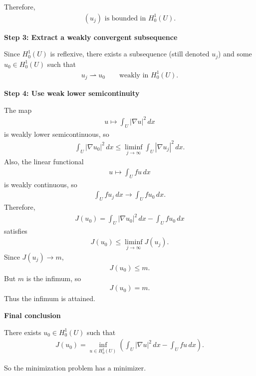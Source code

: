 \documentclass[12pt,a4paper]{report}
\begin{document}
\begin{description}
\begin{description}
Therefore,
\begin{align*}
(u_j)\text{ is bounded in }H_0^1(U).
\end{align*}

\item \textbf{Step 3: Extract a weakly convergent subsequence}

Since $H_0^1(U)$ is reflexive, there exists a subsequence (still denoted $u_j$) and some $u_0\in H_0^1(U)$ such that
\begin{align*}
u_j\rightharpoonup u_0 \qquad\text{weakly in }H_0^1(U).
\end{align*}

\item \textbf{Step 4: Use weak lower semicontinuity}

The map
\begin{align*}
u\mapsto \int_U |\nabla u|^2\,dx
\end{align*}
is weakly lower semicontinuous, so
\begin{align*}
\int_U |\nabla u_0|^2\,dx \le \liminf_{j\to\infty} \int_U |\nabla u_j|^2\,dx.
\end{align*}
Also, the linear functional
\begin{align*}
u\mapsto \int_U fu\,dx
\end{align*}
is weakly continuous, so
\begin{align*}
\int_U fu_j\,dx \to \int_U fu_0\,dx.
\end{align*}
Therefore,
\begin{align*}
J(u_0) = \int_U |\nabla u_0|^2\,dx-\int_U fu_0\,dx
\end{align*}
satisfies
\begin{align*}
J(u_0) \le \liminf_{j\to\infty} J(u_j).
\end{align*}
Since $J(u_j)\to m$,
\begin{align*}
J(u_0)\le m.
\end{align*}
But $m$ is the infimum, so
\begin{align*}
J(u_0)=m.
\end{align*}
Thus the infimum is attained.

\item \textbf{Final conclusion}

There exists $u_0\in H_0^1(U)$ such that
\begin{align*}
\boxed{
J(u_0)= \inf_{u\in H_0^1(U)} \left( \int_U |\nabla u|^2\,dx-\int_U fu\,dx \right).
}
\end{align*}

So the minimization problem has a minimizer.


\end{description}
\end{description}
\end{document}
